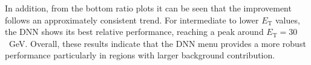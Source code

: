 In addition, from the bottom ratio plots it can be seen that the improvement follows an approximately consistent trend. For intermediate to lower $E_{\mathrm{T}}$ values, the DNN shows its best relative performance, reaching a peak around $E_{\mathrm{T}}=30$~GeV. Overall, these results indicate that the DNN menu provides a more robust performance particularly in regions with larger background contribution.

